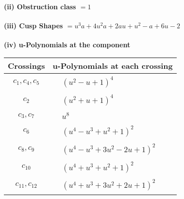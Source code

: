 \documentclass[1p]{elsarticle_modified}
\theoremstyle{definition}
\begin{document}
\flushleft \textbf{(ii) Obstruction class $= 1$}\\~\\
\flushleft \textbf{(iii) Cusp Shapes $= u^3 a+4 u^2 a+2 a u+u^2- a+6 u-2$}\\~\\
\newpage\renewcommand{\arraystretch}{1}
\flushleft \textbf{(iv) u-Polynomials at the component}\newline \\
\begin{tabular}{m{50pt}|m{274pt}}
Crossings & \hspace{64pt}u-Polynomials at each crossing \\
\hline $$\begin{aligned}c_{1},c_{4},c_{5}\end{aligned}$$&$\begin{aligned}
&(u^2- u+1)^4
\end{aligned}$\\
\hline $$\begin{aligned}c_{2}\end{aligned}$$&$\begin{aligned}
&(u^2+u+1)^4
\end{aligned}$\\
\hline $$\begin{aligned}c_{3},c_{7}\end{aligned}$$&$\begin{aligned}
&u^8
\end{aligned}$\\
\hline $$\begin{aligned}c_{6}\end{aligned}$$&$\begin{aligned}
&(u^4- u^3+u^2+1)^2
\end{aligned}$\\
\hline $$\begin{aligned}c_{8},c_{9}\end{aligned}$$&$\begin{aligned}
&(u^4- u^3+3 u^2-2 u+1)^2
\end{aligned}$\\
\hline $$\begin{aligned}c_{10}\end{aligned}$$&$\begin{aligned}
&(u^4+u^3+u^2+1)^2
\end{aligned}$\\
\hline $$\begin{aligned}c_{11},c_{12}\end{aligned}$$&$\begin{aligned}
&(u^4+u^3+3 u^2+2 u+1)^2
\end{aligned}$\\
\hline
\end{tabular}\\~\\
\end{document}
